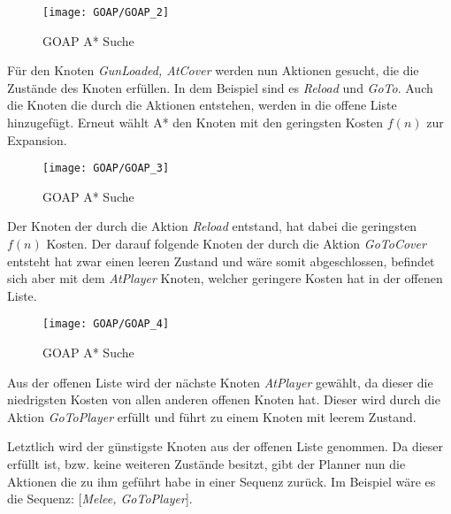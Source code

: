 \begin{figure}[h]
  \centering
  \texttt{[image: GOAP/GOAP\_2]}
	\captionsetup{justification=justified, format=plain}
  \caption{GOAP A* Suche}
  \label{GOAP A* Suche: Erste Aktionen}
\end{figure}

Für den Knoten \textit{GunLoaded, AtCover} werden nun Aktionen gesucht, die die Zustände des Knoten erfüllen. In dem Beispiel sind es \textit{Reload} und \textit{GoTo}. Auch die Knoten die durch die Aktionen entstehen, werden in die offene Liste hinzugefügt. Erneut wählt A* den Knoten mit den geringsten Kosten $f(n)$ zur Expansion.
\clearpage

\begin{figure}[h]
  \centering
  \texttt{[image: GOAP/GOAP\_3]}
	\captionsetup{justification=justified, format=plain}
  \caption{GOAP A* Suche}
  \label{GOAP A* Suche: Erste Aktionen}
\end{figure}

Der Knoten der durch die Aktion \textit{Reload} entstand, hat dabei die geringsten $f(n)$ Kosten. Der darauf folgende Knoten der durch die Aktion \textit{GoToCover} entsteht hat zwar einen leeren Zustand und wäre somit abgeschlossen, befindet sich aber mit dem \textit{AtPlayer} Knoten, welcher geringere Kosten hat in der offenen Liste.
\clearpage

\begin{figure}[h]
  \centering
  \texttt{[image: GOAP/GOAP\_4]}
	\captionsetup{justification=justified, format=plain}
  \caption{GOAP A* Suche}
  \label{GOAP A* Suche: Erste Aktionen}
\end{figure}

Aus der offenen Liste wird der nächste Knoten \textit{AtPlayer} gewählt, da dieser die niedrigsten Kosten von allen anderen offenen Knoten hat. Dieser wird durch die Aktion \textit{GoToPlayer} erfüllt und führt zu einem Knoten mit leerem Zustand.

Letztlich wird der günstigste Knoten aus der offenen Liste genommen. Da dieser erfüllt ist, bzw. keine weiteren Zustände besitzt, gibt der Planner nun die Aktionen die zu ihm geführt habe in einer Sequenz zurück. Im Beispiel wäre es die Sequenz: [\textit{Melee, GoToPlayer}].
\clearpage

